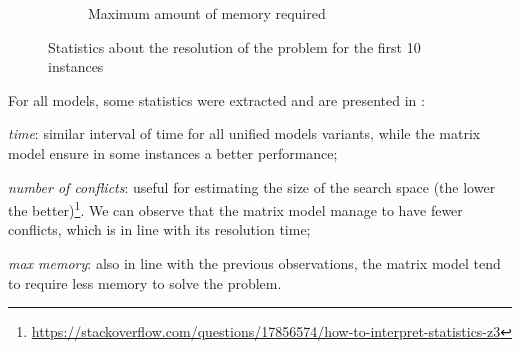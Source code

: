 \begin{figure}[h]
\begin{subfigure}{0.49\linewidth}
        \caption{Maximum amount of memory required}
    \end{subfigure}
    \caption{Statistics about the resolution of the problem for the first 10 instances}
    \label{fig:sat_plots}
\end{figure}

For all models, some statistics were extracted and are presented in :
\begin{enumerate*}[label=(\roman*)]
    \item \textit{time}: similar interval of time for all unified models variants, while the matrix model ensure in some instances a better performance;
    \item \textit{number of conflicts}: useful for estimating the size of the search space (the lower the better)\footnote{\url{https://stackoverflow.com/questions/17856574/how-to-interpret-statistics-z3}}. We can observe that the matrix model manage to have fewer conflicts, which is in line with its resolution time;
    \item \textit{max memory}: also in line with the previous observations, the matrix model tend to require less memory to solve the problem.
\end{enumerate*}
